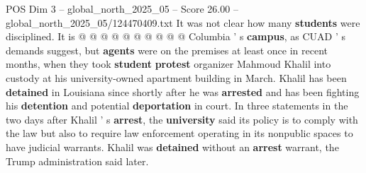 \begin{textsample}{POS Dim 3 – global\_north\_2025\_05 – Score 26.00 – global\_north\_2025\_05/124470409.txt}
It was not clear how many \textbf{students} were disciplined.
It is @ @ @ @ @ @ @ @ @ @ Columbia ' s \textbf{campus}, as CUAD ' s demands suggest, but \textbf{agents} were on the premises at least once in recent months, when they took \textbf{student} \textbf{protest} organizer Mahmoud Khalil into custody at his university-owned apartment building in March.
Khalil has been \textbf{detained} in Louisiana since shortly after he was \textbf{arrested} and has been fighting his \textbf{detention} and potential \textbf{deportation} in court.
In three statements in the two days after Khalil ' s \textbf{arrest}, the \textbf{university} said its policy is to comply with the law but also to require law enforcement operating in its nonpublic spaces to have judicial warrants.
Khalil was \textbf{detained} without an \textbf{arrest} warrant, the Trump administration said later.

\end{textsample}
